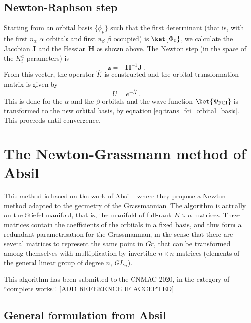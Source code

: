 \documentclass[a4paper,11pt]{article}
\begin{document}
\subsection{Newton-Raphson step}
Starting from an orbital basis $\{\phi_p\}$ such that the first determinant (that is, with the first $n_\alpha$ $\alpha$ orbitals and first $n_\beta$ $\beta$ occupied) is $\ket{\Phi_0}$, we calculate the Jacobian $\mathbf{J}$ and the Hessian $\mathbf{H}$ as shown above.
The Newton step (in the space of the $K_i^a$ parameters) is
\begin{equation}
  \mathbf{z} = -\mathbf{H}^{-1} \mathbf{J}\,.
\end{equation}
From this vector, the operator $\hat{K}$ is constructed and the orbital transformation matrix is given by
\begin{equation}
  U = e^{-\hat{K}}\,.
\end{equation}
This is done for the $\alpha$ and the $\beta$ orbitals and the wave function $\ket{\Psi_\text{FCI}}$ is transformed to the new orbital basis, by equation \eqref{eq:trans_fci_orbital_basis}.
This proceeds until convergence.


\newpage
\section{The Newton-Grassmann method of Absil}

This method is based on the work of Absil \etal{}, where they propose a Newton method adapted to the geometry of the Grassmannian.
The algorithm is actually on the Stiefel manifold, that is, the manifold of full-rank $K \times n$ matrices.
These matrices contain the coefficients of the orbitals in a fixed basis, and thus form a redundant parametrisation for the Grassmannian, in the sense that there are several matrices to represent the same point in $Gr$, that can be transformed among themselves with multiplication by invertible $n \times n$ matrices (elements of the general linear group of degree $n$, $GL_n$).

This algorithm has been submitted to the CNMAC 2020, in the category of ``complete works''. [ADD REFERENCE IF ACCEPTED]

\subsection{General formulation from Absil}
\end{document}
